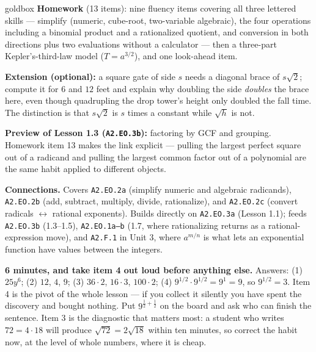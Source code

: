 \documentclass[10pt]{article}
\begin{document}
\boxguard[18]
\begin{skillbox}{goldbox}
\textbf{Homework} (13 items): nine fluency items covering all three lettered skills --- simplify
(numeric, cube-root, two-variable algebraic), the four operations including a binomial product and
a rationalized quotient, and conversion in both directions plus two evaluations without a
calculator --- then a three-part Kepler's-third-law model ($T=a^{3/2}$), and one look-ahead item.

\textbf{Extension (optional):} a square gate of side $s$ needs a diagonal brace of $s\sqrt2$;
compute it for $6$ and $12$ feet and explain why doubling the side \emph{doubles} the brace here,
even though quadrupling the drop tower's height only doubled the fall time. The distinction is
that $s\sqrt2$ is $s$ times a constant while $\sqrt h$ is not.

\textbf{Preview of Lesson 1.3 (\texttt{A2.EO.3b}):} factoring by GCF and grouping. Homework item
13 makes the link explicit --- pulling the largest perfect square out of a radicand and pulling
the largest common factor out of a polynomial are the same habit applied to different objects.

\textbf{Connections.} Covers \texttt{A2.EO.2a} (simplify numeric and algebraic radicands),
\texttt{A2.EO.2b} (add, subtract, multiply, divide, rationalize), and \texttt{A2.EO.2c} (convert
radicals $\leftrightarrow$ rational exponents). Builds directly on \texttt{A2.EO.3a} (Lesson 1.1);
feeds \texttt{A2.EO.3b} (1.3--1.5), \texttt{A2.EO.1a--b} (1.7, where rationalizing returns as a
rational-expression move), and \texttt{A2.F.1} in Unit 3, where $a^{m/n}$ is what lets an
exponential function have values between the integers.
\end{skillbox}

\begin{teachernote}[Warm-Up]
    \textbf{6 minutes, and take item 4 out loud before anything else.} Answers: (1) $25y^6$;
    (2) $12$, $4$, $9$; (3) $36\cdot2$, $16\cdot3$, $100\cdot2$; (4) $9^{1/2}\cdot9^{1/2}=9^1=9$,
    so $9^{1/2}=3$. Item 4 is the pivot of the whole lesson --- if you collect it silently you
    have spent the discovery and bought nothing. Put $9^{\frac12+\frac12}$ on the board and ask
    who can finish the sentence. Item 3 is the diagnostic that matters most: a student who writes
    $72=4\cdot18$ will produce $\sqrt{72}=2\sqrt{18}$ within ten minutes, so correct the habit
    now, at the level of whole numbers, where it is cheap.
\end{teachernote}
\end{document}
